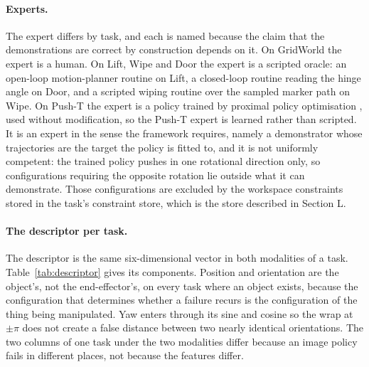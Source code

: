 \documentclass[letterpaper]{article}
\begin{document}
\paragraph{Experts.} The expert differs by task, and each is named because the claim
that the demonstrations are correct by construction depends on it. On GridWorld the
expert is a human. On Lift, Wipe and Door the expert is a scripted oracle: an
open-loop motion-planner routine on Lift, a closed-loop routine reading the hinge
angle on Door, and a scripted wiping routine over the sampled marker path on Wipe. On
Push-T the expert is a policy trained by proximal policy optimisation
\citep{schulman2017ppo}, used without modification, so the Push-T expert is learned
rather than scripted. It is an expert in the sense the framework requires, namely a
demonstrator whose trajectories are the target the policy is fitted to, and it is not
uniformly competent: the trained policy pushes in one rotational direction only, so
configurations requiring the opposite rotation lie outside what it can demonstrate.
Those configurations are excluded by the workspace constraints stored in the task's
constraint store, which is the store described in Section L.

\paragraph{The descriptor per task.} The descriptor is the same six-dimensional vector
in both modalities of a task. Table~\ref{tab:descriptor} gives its components.
Position and orientation are the object's, not the end-effector's, on every task where
an object exists, because the configuration that determines whether a failure recurs is
the configuration of the thing being manipulated. Yaw enters through its sine and
cosine so the wrap at $\pm\pi$ does not create a false distance between two nearly
identical orientations. The two columns of one task under the two modalities differ
because an image policy fails in different places, not because the features differ.
\end{document}
